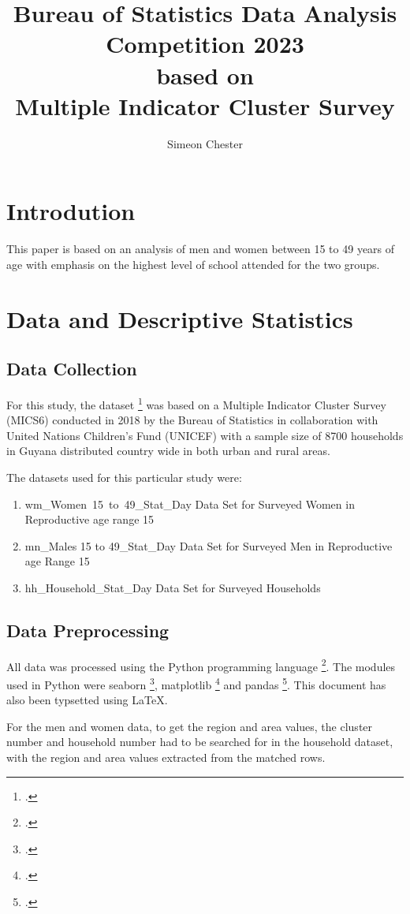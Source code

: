 \documentclass[stu, 12pt, floatsintext,longtable]{apa7}
\author{Simeon Chester}
\title{Bureau of Statistics Data Analysis Competition 2023 \\ based on \\
    Multiple Indicator Cluster Survey}
\begin{document}
\maketitle

\section{Introdution}

This paper is based on an analysis of men and women between 15 to 49 years of
age with emphasis on the highest level of school attended for the two groups.
\section{Data and Descriptive Statistics}
\subsection{Data Collection}

For this study, the dataset \footcite{dataset} was based on a Multiple
Indicator Cluster Survey
(MICS6) conducted in 2018 by the Bureau of Statistics in collaboration with
United Nations Children's Fund (UNICEF) with a sample size of 8700 households
in Guyana
distributed country wide in both urban and rural areas.

The datasets used for this particular study were:
\begin{enumerate}
    \item wm\_Women\ 15\ to\ 49\_Stat\_Day \- Data Set for Surveyed Women in
          Reproductive
          age range 15 
    \item mn\_Males 15 to 49\_Stat\_Day \- Data Set for Surveyed Men in
          Reproductive
          age Range 15 
    \item hh\_Household\_Stat\_Day \- Data Set for Surveyed Households
\end{enumerate}
\subsection{Data Preprocessing}
All data was processed using the Python programming language \footcite{python}.
The
modules used
in Python were seaborn \footcite{seaborn}, matplotlib \footcite{matplotlib} and
pandas \footcite{pandas}. This document has also been
typsetted using \LaTeX.

For the men and women data, to get the region and area values, the cluster
number and household number had to be searched for
in the household dataset, with the region and area values extracted from
the matched rows.
\end{document}
